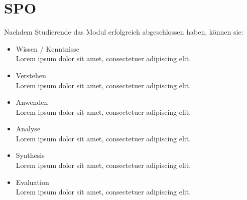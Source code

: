 \section{SPO}

    Nachdem Studierende das Modul erfolgreich abgeschlossen haben, können sie:
    \begin{itemize}
        \item Wissen / Kenntnisse\\
            Lorem ipsum dolor sit amet, consectetuer adipiscing elit.
        \item Verstehen\\
            Lorem ipsum dolor sit amet, consectetuer adipiscing elit.
        \item Anwenden\\
            Lorem ipsum dolor sit amet, consectetuer adipiscing elit.
        \item Analyse\\
            Lorem ipsum dolor sit amet, consectetuer adipiscing elit.
        \item Synthesis\\
            Lorem ipsum dolor sit amet, consectetuer adipiscing elit.
        \item Evaluation\\
            Lorem ipsum dolor sit amet, consectetuer adipiscing elit.
    \end{itemize}
    
\newpage